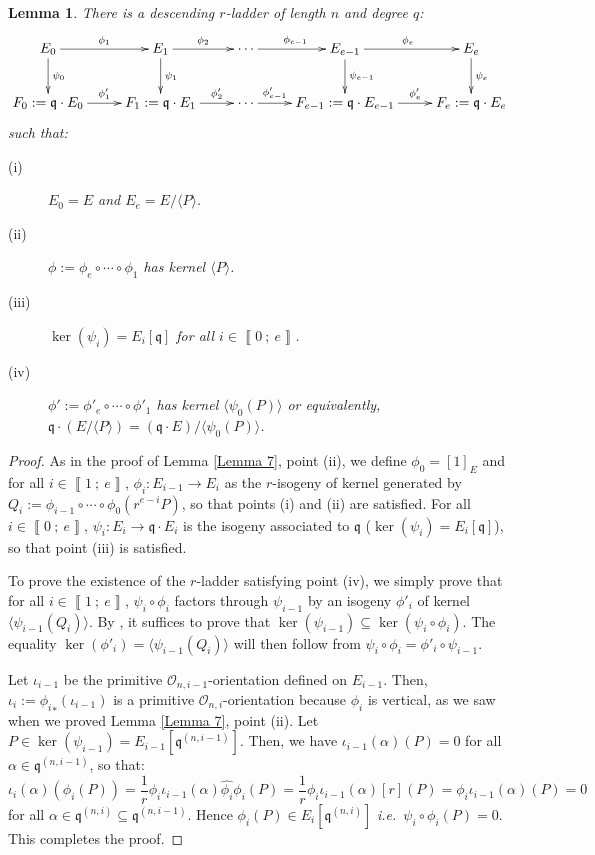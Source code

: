 \documentclass[a4paper,10pt,notitlepage]{report}
\theoremstyle{definition}
\theoremstyle{plain}
\newtheorem{Lemma}[Definition]{Lemma}
\theoremstyle{definition}
\newcommand{\ie}{\emph{i.e.}\ }
\newcommand{\mO}{\mathcal{O}}
\renewcommand{\i}[2]{\left\llbracket #1~;~#2\right\rrbracket}
\renewcommand{\(}{\left(}
\renewcommand{\)}{\right)}
\newcommand{\mf}[1]{\mathfrak{#1}}
\begin{document}
\begin{Lemma}\label{Lemma 8}
There is a descending $r$-ladder of length $n$ and degree $q$:
\[\xymatrix{
E_0 \ar[d]^{\psi_0} \ar[r]^{\phi_1} & E_1\ar[d]^{\psi_1} \ar[r]^{\phi_{2}}& \cdots \ar[r]^{\phi_{e-1}} & E_{e-1} \ar[d]^{\psi_{e-1}} \ar[r]^{\phi_{e}} & E_e \ar[d]^{\psi_e}\\
F_0:=\mf{q}\cdot E_0 \ar[r]^-{\phi'_1} & F_1:=\mf{q}\cdot E_1 \ar[r]^-{\phi'_{2}}& \cdots \ar[r]^-{\phi'_{e-1}} & F_{e-1}:=\mf{q}\cdot E_{e-1} \ar[r]^-{\phi'_{e}} & F_e:=\mf{q}\cdot E_e
}\]
such that: 
\begin{description}
\item[(i)] $E_0=E$ and $E_e=E/\langle P\rangle$.
\item[(ii)] $\phi:=\phi_e\circ\cdots\circ\phi_1$ has kernel $\langle P\rangle$.
\item[(iii)] $\ker(\psi_i)=E_i[\mf{q}]$ for all $i\in\i{0}{e}$.
\item[(iv)] $\phi':=\phi'_e\circ\cdots\circ\phi'_1$ has kernel $\langle \psi_0(P)\rangle$ or equivalently, $\mf{q}\cdot(E/\langle P\rangle)=(\mf{q}\cdot E)/\langle \psi_0(P)\rangle$.
\end{description}
\end{Lemma}

\begin{proof}
As in the proof of Lemma \ref{Lemma 7}, point (ii), we define $\phi_0=[1]_E$ and for all $i\in\i{1}{e}$, $\phi_i :E_{i-1}\longrightarrow E_i$ as the $r$-isogeny of kernel generated by $Q_i:=\phi_{i-1}\circ\cdots\circ\phi_0(r^{e-i}P)$, so that points (i) and (ii) are satisfied. For all $i\in\i{0}{e}$, $\psi_i:E_i\longrightarrow \mf{q}\cdot E_i$ is the isogeny associated to $\mf{q}$ ($\ker(\psi_i)=E_i[\mf{q}]$), so that point (iii) is satisfied. 

To prove the existence of the $r$-ladder satisfying point (iv), we simply prove that for all $i\in\i{1}{e}$, $\psi_i\circ\phi_i$ factors through $\psi_{i-1}$ by an isogeny $\phi'_i$ of kernel $\langle \psi_{i-1}(Q_i)\rangle$.  By \cite[Corollary III.4.11]{Silverman1}, it suffices to prove that $\ker(\psi_{i-1})\subseteq \ker(\psi_i\circ\phi_i)$. The equality $\ker(\phi'_i)=\langle \psi_{i-1}(Q_i)\rangle$ will then follow from $\psi_i\circ\phi_i=\phi'_i\circ\psi_{i-1}$. 

Let $\iota_{i-1}$ be the primitive $\mO_{n,i-1}$-orientation defined on $E_{i-1}$. Then, $\iota_i:={\phi_{i}}_{*}(\iota_{i-1})$ is a primitive $\mO_{n,i}$-orientation because $\phi_{i}$ is vertical, as we saw when we proved Lemma \ref{Lemma 7}, point (ii). Let $P\in\ker(\psi_{i-1})=E_{i-1}[\mf{q}^{(n,i-1)}]$. Then, we have $\iota_{i-1}(\alpha)(P)=0$ for all $\alpha\in\mf{q}^{(n,i-1)}$, so that:
\[\iota_{i}(\alpha)(\phi_i(P))=\frac{1}{r}\phi_i\iota_{i-1}(\alpha)\widehat{\phi_i}\phi_i(P)=\frac{1}{r}\phi_i\iota_{i-1}(\alpha)[r](P)=\phi_i\iota_{i-1}(\alpha)(P)=0\]
for all $\alpha\in \mf{q}^{(n,i)}\subseteq \mf{q}^{(n,i-1)}$. Hence $\phi_i(P)\in E_i[ \mf{q}^{(n,i)}]$ \ie $\psi_i\circ\phi_i(P)=0$. This completes the proof.
\end{proof}
\end{document}
